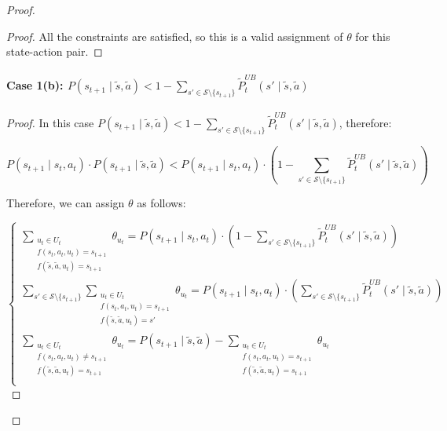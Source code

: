 \begin{proof}
\begin{proof}
All the constraints are satisfied, so this is a valid assignment of $\theta$ for this state-action pair.
\end{proof}

\paragraph{Case 1(b): $P(s_{t+1} \mid \tilde{s}, \tilde{a}) < 1 - \sum_{s' \in \mathcal{S}\setminus\{s_{t+1}\}}{\tilde{P}_{t}^{UB}(s' \mid \tilde{s}, \tilde{a})}$}
\noindent
\begin{proof}
In this case $P(s_{t+1} \mid \tilde{s}, \tilde{a}) < 1 - \sum_{s' \in \mathcal{S}\setminus\{s_{t+1}\}}{\tilde{P}_{t}^{UB}(s' \mid \tilde{s}, \tilde{a})}$, therefore:

\begin{equation}
\label{eq: lbcase1b}
    P(s_{t+1} \mid s_t, a_t) \cdot P(s_{t+1} \mid \tilde{s}, \tilde{a}) < P(s_{t+1} \mid s_t, a_t) \cdot (1 - \sum_{s' \in \mathcal{S}\setminus\{s_{t+1}\}}{\tilde{P}_{t}^{UB}(s' \mid \tilde{s}, \tilde{a})})
\end{equation}

Therefore, we can assign $\theta$ as follows:

\[
\begin{cases}
    \sum_{\substack{u_t \in U_t \\f(s_t, a_t, u_t) = s_{t+1} \\ f(\tilde{s}, \tilde{a}, u_t) = s_{t+1}}}{\theta_{u_t}} = P(s_{t+1} \mid s_t, a_t) \cdot (1 - \sum_{s' \in \mathcal{S}\setminus\{s_{t+1}\}}{\tilde{P}_{t}^{UB}(s' \mid \tilde{s}, \tilde{a})})\\
    
    \sum_{s' \in \mathcal{S}\setminus\{s_{t+1}\}}\sum_{\substack{u_t \in U_t \\f(s_t, a_t, u_t) = s_{t+1} \\ f(\tilde{s}, \tilde{a}, u_t) = s'}}{\theta_{u_t}} = P(s_{t+1} \mid s_t, a_t) \cdot (\sum_{s' \in \mathcal{S}\setminus\{s_{t+1}\}}{\tilde{P}_{t}^{UB}(s' \mid \tilde{s}, \tilde{a})})\\
    
    \sum_{\substack{u_t \in U_t \\f(s_t, a_t, u_t) \neq s_{t+1} \\ f(\tilde{s}, \tilde{a}, u_t) = s_{t+1}}}{\theta_{u_t}} = P(s_{t+1} \mid \tilde{s}, \tilde{a}) - \sum_{\substack{u_t \in U_t \\f(s_t, a_t, u_t) = s_{t+1} \\ f(\tilde{s}, \tilde{a}, u_t) = s_{t+1}}}{\theta_{u_t}} \\
    

\end{cases}\]
\end{proof}
\end{proof}
